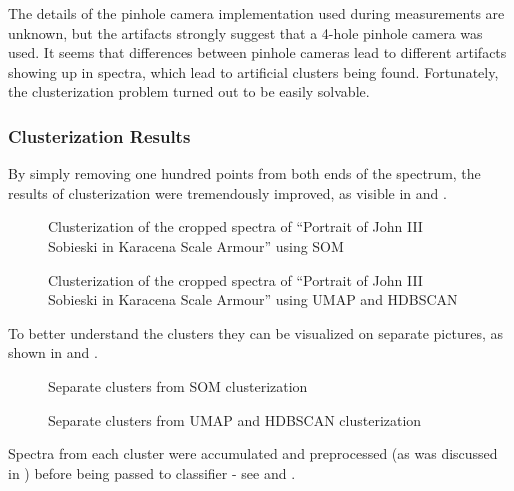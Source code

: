 The details of the pinhole camera implementation used during measurements are unknown, but the artifacts strongly suggest that a 4-hole pinhole camera was used. 
It seems that differences between pinhole cameras lead to different artifacts showing up in spectra, which lead to artificial clusters being found. 
Fortunately, the clusterization problem turned out to be easily solvable.

\newpage
\subsubsection{Clusterization Results}
By simply removing one hundred points from both ends of the spectrum, the results of clusterization were tremendously improved, as visible in  and .

\begin{figure}[H]
  \centering
  
  \caption{Clusterization of the cropped spectra of ``Portrait of John III Sobieski in Karacena Scale Armour'' using SOM}
  \label{fig:som-clusterization-clean}
\end{figure}

\begin{figure}[H]
  \centering
  
  \caption{Clusterization of the cropped spectra of ``Portrait of John III Sobieski in Karacena Scale Armour'' using UMAP and HDBSCAN}
  \label{fig:hdbscan-clusterization-clean}
\end{figure}

\newpage
To better understand the clusters they can be visualized on separate pictures, as shown in  and .
\begin{figure}[!htbp]
  \centering
  
  \caption{Separate clusters from SOM clusterization}
  \label{fig:som-clusters-clean}
\end{figure}

\begin{figure}[!htbp]
  \centering
  
  \caption{Separate clusters from UMAP and HDBSCAN clusterization}
  \label{fig:hdbscan-clusters-clean}
\end{figure}


\newpage
\label{sec:clustered-spectra}
Spectra from each cluster were accumulated and preprocessed (as was discussed in ) before being passed to classifier - see  and .

